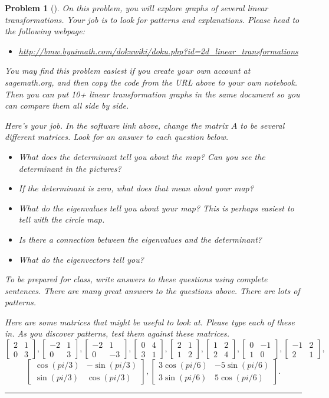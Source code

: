 \documentclass[letterpaper,oneside]{book}%
\newcommand{\urllineartransformationsinplane}{http://bmw.byuimath.com/dokuwiki/doku.php?id=2d\_linear\_transformations}
\theoremstyle{plain}
\theoremstyle{box}
\theoremstyle{problem}
\newtheorem{problemnum}{Problem}[chapter]
\newenvironment{problem}[1][]{\begin{problemnum}[#1]}{\end{problemnum}\nopagebreak\hrule\bigskip}
\newcommand{\bvec}[1]{\begin{bmatrix} #1 \end{bmatrix}}
\begin{document}
\begin{problem}
 On this problem, you will explore graphs of several linear transformations. Your job is to look for patterns and explanations.  Please head to the following webpage:
\begin{itemize}
 \item \href{\urllineartransformationsinplane}{\urllineartransformationsinplane}
\end{itemize}
You may find this problem easiest if you create your own account at sagemath.org, and then copy the code from the URL above to your own notebook. Then you can put 10+ linear transformation graphs in the same document so you can compare them all side by side. 

Here's your job. In the software link above, change the matrix $A$ to be several different matrices. Look for an answer to each question below.
\begin{itemize}
 \item What does the determinant tell you about the map? Can you see the determinant in the pictures?
 \item If the determinant is zero, what does that mean about your map?
 \item What do the eigenvalues tell you about your map? This is perhaps easiest to tell with the circle map.
 \item Is there a connection between the eigenvalues and the determinant?
 \item What do the eigenvectors tell you?
\end{itemize}
To be prepared for class, write answers to these questions using complete sentences.
There are many great answers to the questions above. There are lots of patterns. 

Here are some matrices that might be useful to look at. Please type each of these in.  As you discover patterns, test them against these matrices. 
$$
\bvec{2&1\\0&3},
\bvec{-2&1\\0&3},
\bvec{-2&1\\0&-3},
\bvec{0&4\\3&1},
\bvec{2&1\\1&2},
\bvec{1&2\\2&4},
\bvec{0&-1\\1&0},
\bvec{-1&2\\2&1},
$$
$$\bvec{\cos(pi/3)&-\sin(pi/3)\\ \sin(pi/3)&\cos(pi/3)},
\bvec{3\cos(pi/6)&-5\sin(pi/6)\\ 3\sin(pi/6)&5\cos(pi/6)}.
$$
\end{problem}
\end{document}
